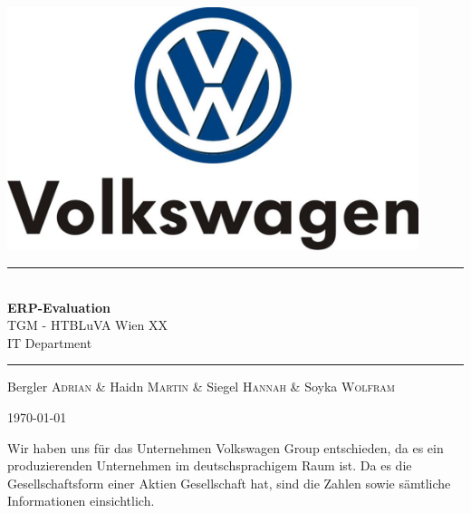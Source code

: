 \documentclass[12pt]{article}
\begin{document}
\begin{titlepage}
\begin{center}
\includegraphics[width=0.9\textwidth]{images/vwlogo}\\[1cm]    


\rule{1.0\textwidth}{1mm}
{ \huge \bfseries \\[0.4cm]  \huge ERP-Evaluation \\[0.4cm] }
\LARGE TGM - HTBLuVA Wien XX \\ IT Department  \\[0.4cm]

\rule{1.0\textwidth}{1mm}




\noindent 
\vspace{3cm}

\begin{center}
\large
Bergler \textsc{Adrian} \&
Haidn \textsc{Martin} \&
Siegel \textsc{Hannah} \&
Soyka \textsc{Wolfram}
\end{center}

\vfill

{\large \today}

\end{center}
\end{titlepage}

\tableofcontents


\ohead{\headmark}

\newpage

\noindent
Wir haben uns für das Unternehmen Volkswagen Group entschieden, da es ein produzierenden Unternehmen im deutschsprachigem Raum ist. Da es die Gesellschaftsform einer Aktien Gesellschaft hat, sind die Zahlen sowie sämtliche Informationen einsichtlich. 
\end{document}
